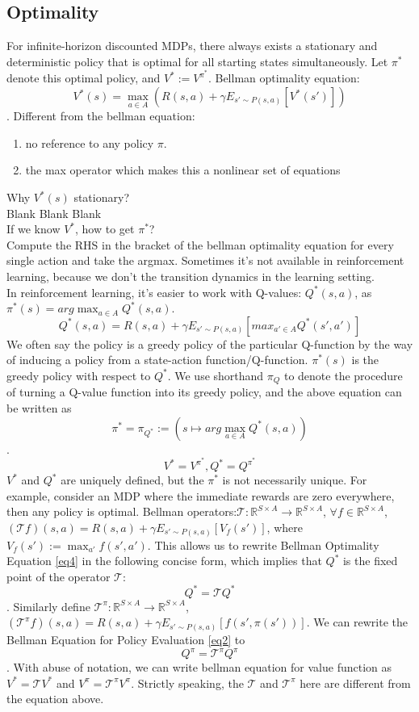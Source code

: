 \documentclass{report}
\begin{document}
\subsection{Optimality}
For infinite-horizon discounted MDPs, there always exists a 
stationary and deterministic policy that is optimal for all starting states simultaneously. Let $\pi^*$ denote this optimal policy, and $V^* := V^{\pi^*}$. Bellman optimality equation: 
\begin{equation}\label{eq3}
    V^*(s)=\max_{a\in A}(R(s,a)+\gamma E_{s'\sim P(s,a)}[V^*(s')])
\end{equation}
. Different from the bellman equation:
\begin{enumerate}
    \item no reference to any policy $\pi$.
    \item the max operator which makes this a nonlinear set of equations
\end{enumerate}
Why $V^*(s)$ stationary? \\
Blank Blank  Blank \\
If we know $V^*$, how to get $\pi^*$? \\
Compute the RHS in the bracket of the bellman optimality equation for every single action and take the argmax. Sometimes it's not available in reinforcement learning, because we don't the transition dynamics in the learning setting.\\
In reinforcement learning, it's easier to work with Q-values: $Q^*(s,a)$, as $\pi^*(s)=arg\max_{a\in A}Q^*(s,a)$. 
\begin{equation}\label{eq4}
    Q^*(s,a)=R(s,a)+\gamma E_{s'\sim P(s,a)}[max_{a'\in A}Q^*(s',a')]
\end{equation}
We often say the policy is a greedy policy of the particular Q-function by the way of inducing a policy from a state-action function/Q-function. $\pi^*(s)$ is the greedy policy with respect to $Q^*$. We use shorthand $\pi_Q$ to denote the procedure of turning a Q-value function into its greedy policy, and the above equation can be written as \[\pi^*=\pi_{Q^*}:=(s \mapsto arg\max_{a\in A}Q^*(s,a))\].
\[
V^*=V^{\pi^*},
Q^*=Q^{\pi^*}
\]
$V^*$ and $Q^*$ are uniquely defined, but the $\pi^*$ is not necessarily unique. For example, consider an MDP where the immediate rewards are zero everywhere, then any policy is optimal. 
Bellman operators:$\mathcal{T}: \mathbb{R}^{S\times A}\rightarrow \mathbb{R}^{S\times A}$, $\forall f \in \mathbb{R}^{S\times A}$, $(\mathcal{T}f)(s,a)=R(s,a)+\gamma E_{s'\sim P(s,a)}[V_f(s')]$, where $V_f(s'):=\max_{a'}f(s',a')$. This allows us to rewrite Bellman Optimality Equation \ref{eq4} in the following concise form, which implies that $Q^*$ is the fixed point of the operator $\mathcal{T}$:\[Q^*=\mathcal{T}Q^*\]. Similarly define $\mathcal{T}^{\pi}: \mathbb{R}^{S\times A}\rightarrow \mathbb{R}^{S\times A}$, $(\mathcal{T}^{\pi}f)(s,a)=R(s,a)+\gamma E_{s'\sim P(s,a)}[f(s',\pi(s'))]$. We can rewrite the Bellman Equation for Policy Evaluation \ref{eq2} to \[Q^{\pi}=\mathcal{T}^{\pi}Q^{\pi}\]. With abuse of notation, we can write bellman equation for value function as $V^{*}=\mathcal{T}V^*$ and $V^{\pi}=\mathcal{T}^{\pi}V^{\pi}$. Strictly speaking, the $\mathcal{T}$ and $\mathcal{T}^{\pi}$ here are different from the equation above.
\end{document}
